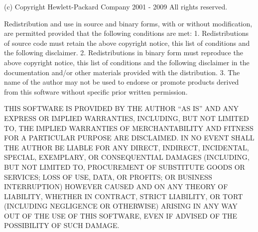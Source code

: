 (c) Copyright Hewlett-\/Packard Company 2001 -\/ 2009 All rights reserved.

Redistribution and use in source and binary forms, with or without modification, are permitted provided that the following conditions are met: 1. Redistributions of source code must retain the above copyright notice, this list of conditions and the following disclaimer. 2. Redistributions in binary form must reproduce the above copyright notice, this list of conditions and the following disclaimer in the documentation and/or other materials provided with the distribution. 3. The name of the author may not be used to endorse or promote products derived from this software without specific prior written permission.

THIS SOFTWARE IS PROVIDED BY THE AUTHOR ``AS IS'' AND ANY EXPRESS OR IMPLIED WARRANTIES, INCLUDING, BUT NOT LIMITED TO, THE IMPLIED WARRANTIES OF MERCHANTABILITY AND FITNESS FOR A PARTICULAR PURPOSE ARE DISCLAIMED. IN NO EVENT SHALL THE AUTHOR BE LIABLE FOR ANY DIRECT, INDIRECT, INCIDENTAL, SPECIAL, EXEMPLARY, OR CONSEQUENTIAL DAMAGES (INCLUDING, BUT NOT LIMITED TO, PROCUREMENT OF SUBSTITUTE GOODS OR SERVICES; LOSS OF USE, DATA, OR PROFITS; OR BUSINESS INTERRUPTION) HOWEVER CAUSED AND ON ANY THEORY OF LIABILITY, WHETHER IN CONTRACT, STRICT LIABILITY, OR TORT (INCLUDING NEGLIGENCE OR OTHERWISE) ARISING IN ANY WAY OUT OF THE USE OF THIS SOFTWARE, EVEN IF ADVISED OF THE POSSIBILITY OF SUCH DAMAGE. 